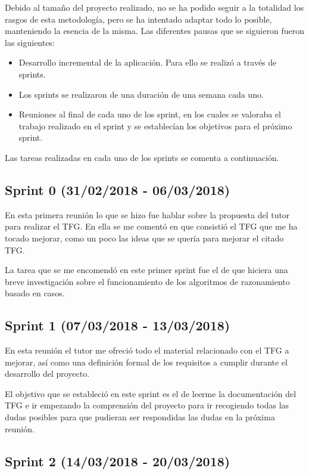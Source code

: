 Debido al tamaño del proyecto realizado, no se ha podido seguir a la totalidad los rasgos de esta metodología, pero se ha intentado adaptar todo lo posible, manteniendo la esencia de la misma. Las diferentes pausas que se siguieron fueron las siguientes:

\begin{itemize}
	\tightlist
	\item
	Desarrollo incremental de la aplicación. Para ello se realizó a través de sprints.
	\item 
	Los sprints se realizaron de una duración de una semana cada uno.
	\item 
	Reuniones al final de cada uno de los sprint, en los cuales se valoraba el trabajo realizado en el sprint y se establecían los objetivos para el próximo sprint.
\end{itemize}

Las tareas realizadas en cada uno de los sprints se comenta a continuación.

\subsection{Sprint 0 (31/02/2018 - 06/03/2018)}

En esta primera reunión lo que se hizo fue hablar sobre la propuesta del tutor para realizar el TFG. En ella se me comentó en que consistió el TFG que me ha tocado mejorar, como un poco las ideas que se quería para mejorar el citado TFG.

La tarea que se me encomendó en este primer sprint fue el de que hiciera una breve investigación sobre el funcionamiento de los algoritmos de razonamiento basado en casos.

\subsection{Sprint 1 (07/03/2018 - 13/03/2018)}

En esta reunión el tutor me ofreció todo el material relacionado con el TFG a mejorar, así como una definición formal de los requisitos a cumplir durante el desarrollo del proyecto.

El objetivo que se estableció en este sprint es el de leerme la documentación del TFG e ir empezando la comprensión del proyecto para ir recogiendo todas las dudas posibles para que pudieran ser respondidas las dudas en la próxima reunión.

\subsection{Sprint 2 (14/03/2018 - 20/03/2018)}

